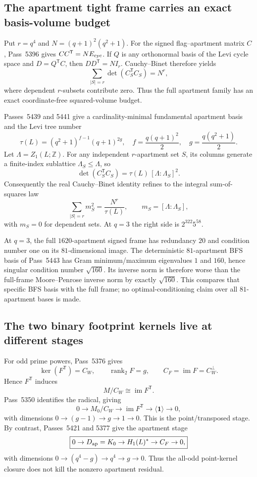 \subsection{The apartment tight frame carries an exact basis-volume budget}

Put $r=q^4$ and $N=(q+1)^2(q^2+1)$.  For the signed flag--apartment matrix
$C$, Pass~5396 gives $CC^{\mathsf T}=N E_{\rm cyc}$.  If $Q$ is any
orthonormal basis of the Levi cycle space and $D=Q^{\mathsf T}C$, then
$DD^{\mathsf T}=NI_r$.  Cauchy--Binet therefore yields
\[
 \boxed{
 \sum_{|S|=r}\det(C_S^{\mathsf T}C_S)=N^r,
 }
\]
where dependent $r$-subsets contribute zero.  Thus the full apartment family has
an exact coordinate-free squared-volume budget.

Passes~5439 and 5441 give a cardinality-minimal fundamental apartment basis and
the Levi tree number
\[
 \tau(L)=(q^2+1)^{f-1}(q+1)^{2g},
 \quad
 f=\frac{q(q+1)^2}{2},\quad
 g=\frac{q(q^2+1)}2.
\]
Let $\Lambda=Z_1(L;\mathbb Z)$.  For any independent $r$-apartment set $S$,
its columns generate a finite-index sublattice $\Lambda_S\le\Lambda$, so
\[
 \boxed{
 \det(C_S^{\mathsf T}C_S)=\tau(L)\,[\Lambda:\Lambda_S]^2.
 }
\]
Consequently the real Cauchy--Binet identity refines to the integral sum-of-squares
law
\[
 \boxed{
 \sum_{|S|=r}m_S^2=\frac{N^r}{\tau(L)},
 \qquad
 m_S=[\Lambda:\Lambda_S],
 }
\]
with $m_S=0$ for dependent sets.  At $q=3$ the right side is
$2^{322}5^{58}$.

At $q=3$, the full $1620$-apartment signed frame has redundancy $20$ and
condition number one on its $81$-dimensional image.  The deterministic
$81$-apartment BFS basis of Pass~5443 has Gram minimum/maximum eigenvalues
$1$ and $160$, hence singular condition number $\sqrt{160}$.  Its inverse norm
is therefore worse than the full-frame Moore--Penrose inverse norm by exactly
$\sqrt{160}$.  This compares that specific BFS basis with the full frame; no
optimal-conditioning claim over all $81$-apartment bases is made.

\subsection{The two binary footprint kernels live at different stages}

For odd prime powers, Pass~5376 gives
\[
 \ker(F^{\mathsf T})=C_W,
 \qquad
 \operatorname{rank}_2F=g,
 \qquad
 C_F=\operatorname{im}F=C_W^\perp.
\]
Hence $F^{\mathsf T}$ induces
\[
 M/C_W\cong\operatorname{im}F^{\mathsf T}.
\]
Pass~5350 identifies the radical, giving
\[
 \boxed{
 0\to M_0/C_W\to\operatorname{im}F^{\mathsf T}\to\langle\mathbf1\rangle\to0,
 }
\]
with dimensions $0\to(g-1)\to g\to1\to0$.  This is the point/transposed
stage.  By contrast, Passes~5421 and 5377 give the apartment stage
\[
 \boxed{
 0\to D_{\rm ap}=K_0\to H_1(L)^*\to C_F\to0,
 }
\]
with dimensions $0\to(q^4-g)\to q^4\to g\to0$.  Thus the all-odd point-kernel
closure does not kill the nonzero apartment residual.

